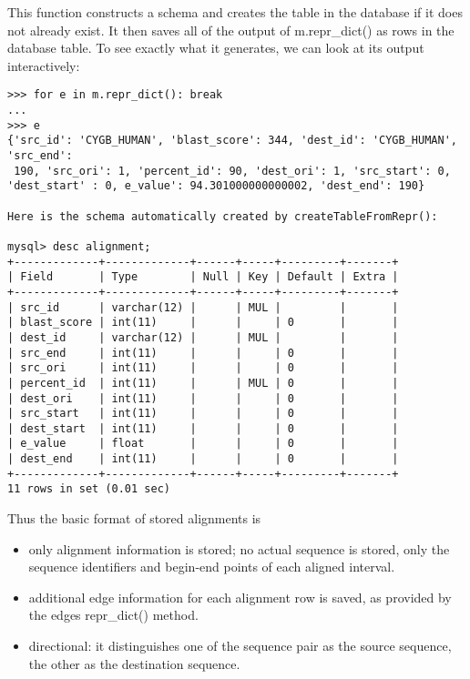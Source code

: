 \documentclass{howto}
\begin{document}
This function constructs a schema and creates the table in the database if it does not already exist.  It then saves all of the output of m.repr_dict() as rows in the database table.  To see exactly what it generates, we can look at its output interactively:

\begin{verbatim}
>>> for e in m.repr_dict(): break
... 
>>> e
{'src_id': 'CYGB_HUMAN', 'blast_score': 344, 'dest_id': 'CYGB_HUMAN', 'src_end':
 190, 'src_ori': 1, 'percent_id': 90, 'dest_ori': 1, 'src_start': 0, 'dest_start' : 0, e_value': 94.301000000000002, 'dest_end': 190}

Here is the schema automatically created by createTableFromRepr():

mysql> desc alignment;
+-------------+-------------+------+-----+---------+-------+
| Field       | Type        | Null | Key | Default | Extra |
+-------------+-------------+------+-----+---------+-------+
| src_id      | varchar(12) |      | MUL |         |       |
| blast_score | int(11)     |      |     | 0       |       |
| dest_id     | varchar(12) |      | MUL |         |       |
| src_end     | int(11)     |      |     | 0       |       |
| src_ori     | int(11)     |      |     | 0       |       |
| percent_id  | int(11)     |      | MUL | 0       |       |
| dest_ori    | int(11)     |      |     | 0       |       |
| src_start   | int(11)     |      |     | 0       |       |
| dest_start  | int(11)     |      |     | 0       |       |
| e_value     | float       |      |     | 0       |       |
| dest_end    | int(11)     |      |     | 0       |       |
+-------------+-------------+------+-----+---------+-------+
11 rows in set (0.01 sec)
\end{verbatim}

Thus the basic format of stored alignments is

\begin{itemize}

\item
only alignment information is stored; no actual sequence is stored, only the sequence identifiers and begin-end points of each aligned interval.

\item
additional edge information for each alignment row is saved, as provided by the edges repr_dict() method.

\item
directional: it distinguishes one of the sequence pair as the source sequence, the other as the destination sequence.

\end{itemize}
\end{document}
